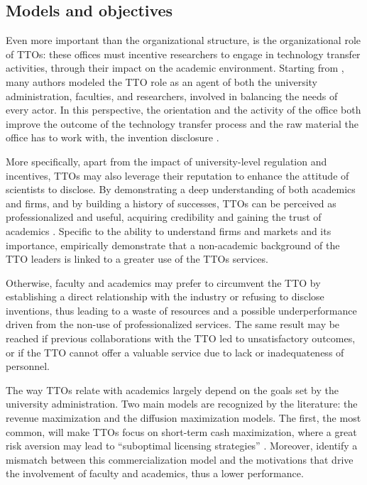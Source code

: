 \subsection{Models and objectives}

Even more important than the organizational structure, is the organizational role of TTOs: these offices must incentive researchers to engage in technology transfer activities, through their impact on the academic environment. Starting from \citet{Jensen1998}, many authors modeled the TTO role as an agent of both the university administration, faculties, and researchers, involved in balancing the needs of every actor. In this perspective, the orientation and the activity of the office both improve the outcome of the technology transfer process and the raw material the office has to work with, the invention disclosure \citep{Siegel2007}. 

More specifically, apart from the impact of university-level regulation and incentives, TTOs may also leverage their reputation to enhance the attitude of scientists to disclose. By demonstrating a deep understanding of both academics and firms, and by building a history of successes, TTOs can be perceived as professionalized and useful, acquiring credibility and gaining the trust of academics \citep{OwenSmith2001}. Specific to the ability to understand firms and markets and its importance, \citet{Muscio2010} empirically demonstrate that a non-academic background of the TTO leaders is linked to a greater use of the TTOs services.

Otherwise, faculty and academics may prefer to circumvent the TTO by establishing a direct relationship with the industry or refusing to disclose inventions, thus leading to a waste of resources and a possible underperformance driven from the non-use of professionalized services. The same result may be reached if previous collaborations with the TTO  led to unsatisfactory outcomes, or if the TTO cannot offer a valuable service due to lack or inadequateness of personnel. 

The way TTOs relate with academics largely depend on the goals set by the university administration. Two main models are recognized by the literature: the revenue maximization and the diffusion maximization models. The first, the most common, will make TTOs focus on short-term cash maximization, where a great risk aversion may lead to \enquote{suboptimal licensing strategies} \citep{Markman2005}. Moreover, \citet{Siegel2003} identify a mismatch between this commercialization model and the motivations that drive the involvement of faculty and academics, thus a lower performance.

